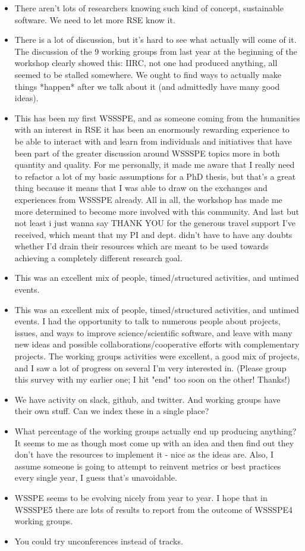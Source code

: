 \begin{itemize}
\item There aren't lots of researchers knowing such kind of concept, sustainable software. We need to let more RSE know it.
\item There is a lot of discussion, but it's hard to see what actually will come of it. The discussion of the 9 working groups from last year at the beginning of the workshop clearly showed this: IIRC, not one had produced anything, all seemed to be stalled somewhere. We ought to find ways to actually make things *happen* after we talk about it (and admittedly have many good ideas).
\item This has been my first WSSSPE, and as someone coming from the humanities with an interest in RSE it has been an enormously rewarding experience to be able to interact with and learn from individuals and initiatives that have been part of the greater discussion around WSSSPE topics more in both quantity and quality. For me personally, it made me aware that I really need to refactor a lot of my basic assumptions for a PhD thesis, but that's a great thing because it means that I was able to draw on the exchanges and experiences from WSSSPE already. All in all, the workshop has made me more determined to become more involved with this community. And last but not least i just wanna say THANK YOU for the generous travel support I've received, which meant that my PI and dept. didn't have to have any doubts whether I'd drain their resources which are meant to be used towards achieving a completely different research goal.
\item This was an excellent mix of people, timed/structured activities, and untimed events.
\item This was an excellent mix of people, timed/structured activities, and untimed events. I had the opportunity to talk to numerous people about projects, issues, and ways to improve science/scientific software, and leave with many new ideas and possible collaborations/cooperative efforts with complementary projects. The working groups activities were excellent, a good mix of projects, and I saw a lot of progress on several I'm very interested in. (Please group this survey with my earlier one; I hit "end" too soon on the other! Thanks!)
\item We have activity on slack, github, and twitter. And working groups have their own stuff. Can we index these in a single place?
\item What percentage of the working groups actually end up producing anything? It seems to me as though most come up with an idea and then find out they don't have the resources to implement it - nice as the ideas are. Also, I assume someone is going to attempt to reinvent metrics or best practices every single year, I guess that's unavoidable.
\item WSSPE seems to be evolving nicely from year to year.  I hope that in WSSSPE5 there are lots of results to report from the outcome of WSSSPE4 working groups.
\item You could try unconferences instead of tracks. 
\end{itemize}
